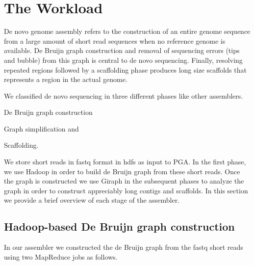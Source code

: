\documentclass[conference]{IEEEtran}
\begin{document}

\section {The Workload} \label{TheWorkload}
De novo genome assembly refers to the construction of an entire genome sequence from a large amount of short read sequences when no reference genome is available. 
De Bruijn graph construction  and removal of sequencing errors (tips and bubble) from this graph is central to de novo sequencing. 
Finally, resolving  repeated regions followed by a scaffolding phase produces long size scaffolds that represents a region in the actual genome.

We classified de novo sequencing in three different phases like other assemblers.
\begin{inparaenum}
\item De Bruijn graph construction
\item Graph simplification and
\item Scaffolding.
\end{inparaenum}
We store short reads in fastq format in hdfs as input to PGA.
In the first phase, we use Hadoop in order to build de Bruijn graph from these short reads. 
Once the graph is constructed we use Giraph in the subsequent phases to analyze the graph in order to construct appreciably long contigs and scaffolds.
In this section we provide a brief overview of each stage of the assembler.

\subsection {Hadoop-based De Bruijn graph construction}
In our assembler we constructed the de Bruijn graph from the fastq short reads using two MapReduce jobs as follows. 
\end{document}
